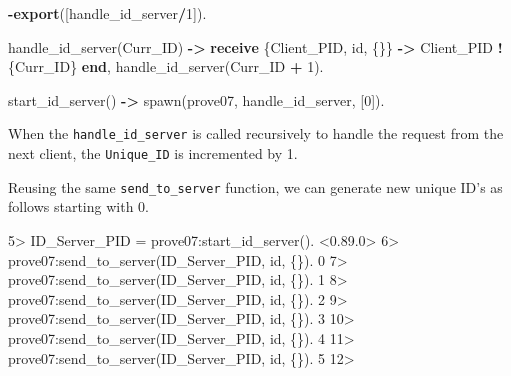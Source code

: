 \documentclass[
]{book}
\newenvironment{Shaded}{\begin{snugshade}}{\end{snugshade}}
\newcommand{\CharTok}[1]{\textcolor[rgb]{0.31,0.60,0.02}{#1}}
\newcommand{\DecValTok}[1]{\textcolor[rgb]{0.00,0.00,0.81}{#1}}
\newcommand{\FunctionTok}[1]{\textcolor[rgb]{0.00,0.00,0.00}{#1}}
\newcommand{\KeywordTok}[1]{\textcolor[rgb]{0.13,0.29,0.53}{\textbf{#1}}}
\newcommand{\NormalTok}[1]{#1}
\newcommand{\OperatorTok}[1]{\textcolor[rgb]{0.81,0.36,0.00}{\textbf{#1}}}
\newcommand{\VariableTok}[1]{\textcolor[rgb]{0.00,0.00,0.00}{#1}}
\begin{document}
\begin{Shaded}
\begin{Highlighting}[]
\KeywordTok{{-}export}\FunctionTok{([}\CharTok{handle\_id\_server}\OperatorTok{/}\DecValTok{1}\FunctionTok{]).}

\FunctionTok{handle\_id\_server(}\VariableTok{Curr\_ID}\FunctionTok{)} \OperatorTok{{-}\textgreater{}}
    \KeywordTok{receive}
        \FunctionTok{\{}\VariableTok{Client\_PID}\FunctionTok{,} \CharTok{id}\FunctionTok{,} \FunctionTok{\{\}\}} \OperatorTok{{-}\textgreater{}} \VariableTok{Client\_PID} \OperatorTok{!} \FunctionTok{\{}\VariableTok{Curr\_ID}\FunctionTok{\}}
    \KeywordTok{end}\FunctionTok{,}
    \FunctionTok{handle\_id\_server(}\VariableTok{Curr\_ID} \OperatorTok{+} \DecValTok{1}\FunctionTok{).}

\FunctionTok{start\_id\_server()} \OperatorTok{{-}\textgreater{}}
    \FunctionTok{spawn(}\CharTok{prove07}\FunctionTok{,} \CharTok{handle\_id\_server}\FunctionTok{,} \FunctionTok{[}\DecValTok{0}\FunctionTok{]).}
\end{Highlighting}
\end{Shaded}

When the \texttt{handle\_id\_server} is called recursively to handle the request from the next client, the \texttt{Unique\_ID} is incremented by 1.

Reusing the same \texttt{send\_to\_server} function, we can generate new unique ID's as follows starting with 0.

\begin{Shaded}
\begin{Highlighting}[]
\NormalTok{5\textgreater{} ID\_Server\_PID = prove07:start\_id\_server(). }
\NormalTok{\textless{}0.89.0\textgreater{}}
\NormalTok{6\textgreater{} prove07:send\_to\_server(ID\_Server\_PID, id, \{\}).       }
\NormalTok{0}
\NormalTok{7\textgreater{} prove07:send\_to\_server(ID\_Server\_PID, id, \{\}).}
\NormalTok{1}
\NormalTok{8\textgreater{} prove07:send\_to\_server(ID\_Server\_PID, id, \{\}).}
\NormalTok{2}
\NormalTok{9\textgreater{} prove07:send\_to\_server(ID\_Server\_PID, id, \{\}).}
\NormalTok{3}
\NormalTok{10\textgreater{} prove07:send\_to\_server(ID\_Server\_PID, id, \{\}).}
\NormalTok{4}
\NormalTok{11\textgreater{} prove07:send\_to\_server(ID\_Server\_PID, id, \{\}).}
\NormalTok{5}
\NormalTok{12\textgreater{} }
\end{Highlighting}
\end{Shaded}
\end{document}
